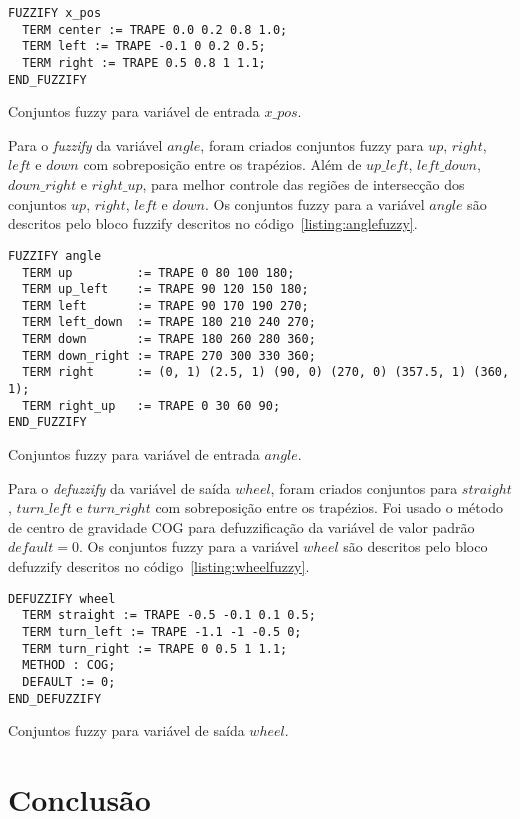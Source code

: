 \documentclass[12pt, a4paper]{article}
\begin{document}
\begin{listing}[h!]
  \begin{verbatim}
FUZZIFY x_pos
  TERM center := TRAPE 0.0 0.2 0.8 1.0;
  TERM left := TRAPE -0.1 0 0.2 0.5;
  TERM right := TRAPE 0.5 0.8 1 1.1;
END_FUZZIFY
\end{verbatim}
  \caption{Conjuntos fuzzy para variável de entrada $x\_pos$.}\label{listing:xposfuzzy}
\end{listing}

Para o \textit{fuzzify} da variável $angle$, foram criados conjuntos fuzzy para $up$, $right$, $left$ e $down$ com sobreposição entre os trapézios.
Além de $up\_left$, $left\_down$, $down\_right$ e $right\_up$, para melhor controle das regiões de intersecção dos conjuntos $up$, $right$, $left$ e $down$.
Os conjuntos fuzzy para a variável $angle$ são descritos pelo bloco fuzzify descritos no código~\ref{listing:anglefuzzy}.

\begin{listing}[h!]
  \begin{verbatim}
FUZZIFY angle
  TERM up         := TRAPE 0 80 100 180;
  TERM up_left    := TRAPE 90 120 150 180;
  TERM left       := TRAPE 90 170 190 270;
  TERM left_down  := TRAPE 180 210 240 270;
  TERM down       := TRAPE 180 260 280 360;
  TERM down_right := TRAPE 270 300 330 360;
  TERM right      := (0, 1) (2.5, 1) (90, 0) (270, 0) (357.5, 1) (360, 1);
  TERM right_up   := TRAPE 0 30 60 90;
END_FUZZIFY
  \end{verbatim}
  \caption{Conjuntos fuzzy para variável de entrada $angle$.}\label{listing:anglefuzzy}
\end{listing}

Para o \textit{defuzzify} da variável de saída $wheel$, foram criados conjuntos para $straight$, $turn\_left$ e $turn\_right$ com sobreposição entre os trapézios.
Foi usado o método de centro de gravidade COG para defuzzificação da variável de valor padrão $default = 0$.
Os conjuntos fuzzy para a variável $wheel$ são descritos pelo bloco defuzzify descritos no código~\ref{listing:wheelfuzzy}.

\begin{listing}[h!]
  \begin{verbatim}
DEFUZZIFY wheel
  TERM straight := TRAPE -0.5 -0.1 0.1 0.5;
  TERM turn_left := TRAPE -1.1 -1 -0.5 0;
  TERM turn_right := TRAPE 0 0.5 1 1.1;
  METHOD : COG;
  DEFAULT := 0;
END_DEFUZZIFY
  \end{verbatim}
  \caption{Conjuntos fuzzy para variável de saída $wheel$.}\label{listing:wheelfuzzy}
\end{listing}

\section{Conclusão}
\end{document}
